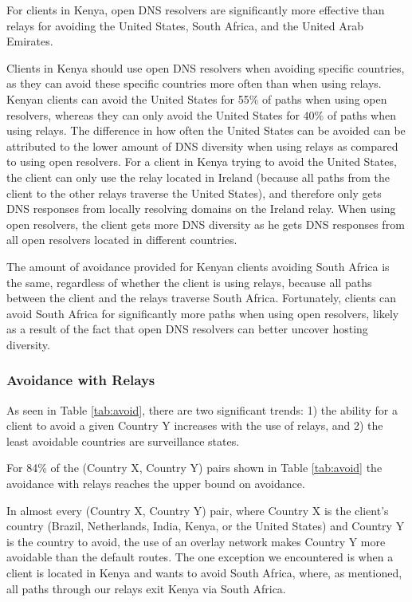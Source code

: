 \begin{finding}
For clients in Kenya, open DNS resolvers are significantly more
effective than relays for 
avoiding the United States, South Africa, and the United Arab Emirates.
\end{finding}
\noindent
Clients in Kenya should use open DNS resolvers when avoiding specific
countries, as they can avoid these specific countries more often than
when using relays.  Kenyan clients can avoid the United States for 55\%
of paths when using open resolvers, whereas they can only avoid the United States for 40\% of
paths when using relays.  The difference in how often the United States can be avoided can be
attributed to the lower amount of DNS diversity when using relays as
compared to using open resolvers. For a client in Kenya trying to avoid
the United States, the client can only use the relay located in Ireland
(because all paths from the client to the other relays traverse the
United States), and therefore only gets DNS responses from locally
resolving domains on the Ireland relay.  When using open resolvers, the
client gets more DNS diversity as he gets DNS responses from all open
resolvers located in different countries. 

The amount of avoidance provided for Kenyan clients avoiding South Africa is the same,
regardless of whether the client is using relays, because all paths
between the client and the relays traverse South Africa.  Fortunately,
clients can avoid South Africa for significantly more paths when using
open resolvers, likely as a result of the fact that open DNS resolvers
can better uncover hosting diversity.   

\subsubsection{Avoidance with Relays}
As seen in Table \ref{tab:avoid}, there are two significant trends: 1) the ability for a client to avoid a given Country Y increases with the use of relays, and 2) the least avoidable countries are surveillance states.

\begin{finding}
For 84\% of the (Country X, Country Y) pairs shown in Table \ref{tab:avoid} the avoidance with relays reaches the upper bound on avoidance. 
\end{finding}
\noindent
In almost every (Country X, Country Y) pair, where Country X is the
client's country (Brazil, Netherlands, India, Kenya, or the United
States) and Country Y is the country to avoid, the use of an overlay
network makes Country Y more avoidable than the default routes.  The one
exception we encountered is when a client is located in Kenya and wants
to avoid South Africa, where, as mentioned, all paths through our
relays exit Kenya via South Africa.

